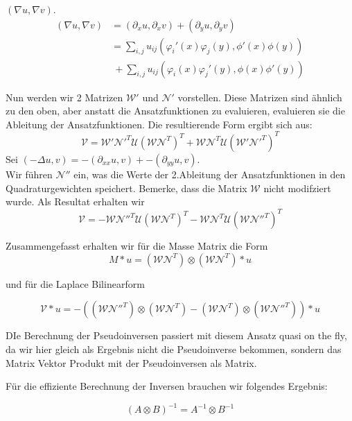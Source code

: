 $(\nabla u, \nabla v)$.
\begin{align}
(\nabla u, \nabla v) &=(\partial_x u,\partial_x v) + (\partial_y u,\partial_y v) \\
					   &=\sum_{i,j} u_{ij} (\varphi_i'(x)\varphi_j(y),\phi'(x)\phi(y)) \\
					   & \ + \sum_{i,j} u_{ij} (\varphi_i(x)\varphi_j'(y),\phi(x)\phi'(y))
\end{align}

Nun werden wir 2 Matrizen  $\mathcal{W}'$ und $\mathcal{N}'$ vorstellen.
Diese Matrizen sind ähnlich zu den oben, aber anstatt die Ansatzfunktionen zu evaluieren, evaluieren sie die Ableitung der Ansatzfunktionen. Die resultierende Form ergibt sich aus:
\[\mathcal{V}=\mathcal{W}' \mathcal{N}'^T \mathcal{U} (\mathcal{W} \mathcal{N}^T)^T +\mathcal{W} \mathcal{N}^T \mathcal{U} (\mathcal{W}' \mathcal{N}'^T)^T\]
Sei $(-\Delta u, v)=-(\partial_{xx} u,v) + -(\partial_{yy} u,v)$.\\
Wir führen $\mathcal{N}''$ ein, was die Werte der 2.Ableitung der Ansatzfunktionen in den Quadraturgewichten speichert. Bemerke, dass die Matrix $\mathcal{W}$ nicht modifziert wurde. Als Resultat erhalten wir
\[\mathcal{V}=-\mathcal{W} \mathcal{N}''^T \mathcal{U} (\mathcal{W} \mathcal{N}^T)^T -\mathcal{W} \mathcal{N}^T \mathcal{U} (\mathcal{W} \mathcal{N}''^T)^T\]


Zusammengefasst erhalten wir für die Masse Matrix die Form
\begin{equation}
M*u = (\mathcal{W} \mathcal{N}^{T}) \otimes (\mathcal{W} \mathcal{N}^{T})*u
\end{equation}

und für die Laplace Bilinearform

\begin{equation}
\mathcal{V}*u = -((\mathcal{W} \mathcal{N''}^{T}) \otimes (\mathcal{W} \mathcal{N}^{T}) - (\mathcal{W} \mathcal{N}^{T}) \otimes (\mathcal{W} \mathcal{N''}^{T}))*u
\end{equation}

DIe Berechnung der Pseudoinversen passiert mit diesem Ansatz quasi on the fly, da wir hier gleich als Ergebnis nicht die Pseudoinverse bekommen, sondern das Matrix Vektor Produkt mit der Pseudoinversen als Matrix.

Für die effiziente Berechnung der Inversen brauchen wir folgendes Ergebnis:
\begin{Bemerkung}
\begin{equation}
(A \otimes B)^{-1} = A^{-1} \otimes B^{-1}
\end{equation}
\end{Bemerkung}

